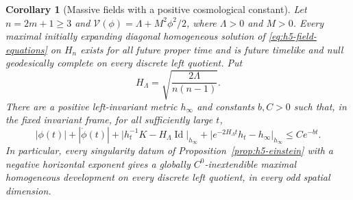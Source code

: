 \documentclass[10pt,a4paper]{article}
\numberwithin{equation}{section}
\newtheorem{corollary}[theorem]{Corollary}
\theoremstyle{definition}
\theoremstyle{remark}
\begin{document}
\begin{corollary}[Massive fields with a positive cosmological constant]
\label{cor:heisenberg-massive-all-dimensions}
Let $n=2m+1\ge3$ and
$\mathcal V(\phi)=\Lambda+M^2\phi^2/2$, where $\Lambda>0$ and $M>0$.
Every maximal initially expanding diagonal homogeneous solution of
\eqref{eq:h5-field-equations} on $H_n$ exists for all future proper
time and is future timelike and null geodesically complete on every
discrete left quotient.  Put
\[
 H_\Lambda=\sqrt{\frac{2\Lambda}{n(n-1)}}.
\]
There are a positive left-invariant metric $h_\infty$ and constants
$b,C>0$ such that, in the fixed invariant frame, for all sufficiently
large $t$,
\begin{equation}
 |\phi(t)|+|\dot\phi(t)|+
 \bigl|h_t^{-1}K-H_\Lambda\operatorname{Id}\bigr|_{h_\infty}
 +\bigl|e^{-2H_\Lambda t}h_t-h_\infty\bigr|_{h_\infty}
 \le Ce^{-bt}.
 \label{eq:heisenberg-massive-future}
\end{equation}
In particular, every singularity datum of
Proposition~\ref{prop:h5-einstein} with a negative horizontal
exponent gives a globally $C^0$-inextendible maximal homogeneous
development on every discrete left quotient, in every odd spatial
dimension.
\end{corollary}
\end{document}
